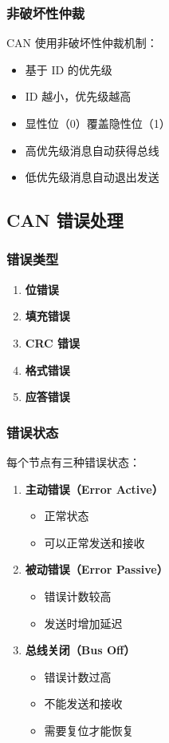 \subsubsection{非破坏性仲裁}

CAN 使用非破坏性仲裁机制：
\begin{itemize}
  \item 基于 ID 的优先级
  \item ID 越小，优先级越高
  \item 显性位（0）覆盖隐性位（1）
  \item 高优先级消息自动获得总线
  \item 低优先级消息自动退出发送
\end{itemize}

\subsection{CAN 错误处理}

\subsubsection{错误类型}

\begin{enumerate}
  \item \textbf{位错误}
  \item \textbf{填充错误}
  \item \textbf{CRC 错误}
  \item \textbf{格式错误}
  \item \textbf{应答错误}
\end{enumerate}

\subsubsection{错误状态}

每个节点有三种错误状态：
\begin{enumerate}
  \item \textbf{主动错误（Error Active）}
    \begin{itemize}
      \item 正常状态
      \item 可以正常发送和接收
    \end{itemize}

  \item \textbf{被动错误（Error Passive）}
    \begin{itemize}
      \item 错误计数较高
      \item 发送时增加延迟
    \end{itemize}

  \item \textbf{总线关闭（Bus Off）}
    \begin{itemize}
      \item 错误计数过高
      \item 不能发送和接收
      \item 需要复位才能恢复
    \end{itemize}
\end{enumerate}

